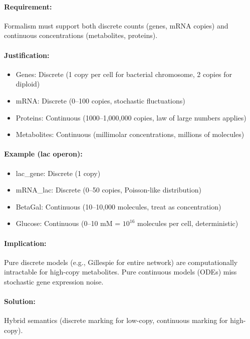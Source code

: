 \paragraph{Requirement:} Formalism must support both discrete counts (genes, mRNA copies) and continuous concentrations (metabolites, proteins).

\paragraph{Justification:}
\begin{itemize}
    \item Genes: Discrete (1 copy per cell for bacterial chromosome, 2 copies for diploid)
    \item mRNA: Discrete (0--100 copies, stochastic fluctuations)
    \item Proteins: Continuous (1000--1,000,000 copies, law of large numbers applies)
    \item Metabolites: Continuous (millimolar concentrations, millions of molecules)
\end{itemize}

\paragraph{Example (lac operon):}
\begin{itemize}
    \item lac\_gene: Discrete (1 copy)
    \item mRNA\_lac: Discrete (0--50 copies, Poisson-like distribution)
    \item BetaGal: Continuous (10--10,000 molecules, treat as concentration)
    \item Glucose: Continuous (0--10 mM = $10^{16}$ molecules per cell, deterministic)
\end{itemize}

\paragraph{Implication:} Pure discrete models (e.g., Gillespie for entire network) are computationally intractable for high-copy metabolites. Pure continuous models (ODEs) miss stochastic gene expression noise.

\paragraph{Solution:} Hybrid semantics (discrete marking for low-copy, continuous marking for high-copy).

